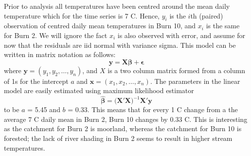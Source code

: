 Prior to analysis all temperatures have been centred around the mean daily temperature which for the time series is 7 \degrees C.  Hence, $y_i$ is the $i$th  (paired) observation of centred daily mean temperatures in Burn 10, and $x_i$ is the same for Burn 2. We will ignore the fact $x_i$ is also observed with error, and assume for now that the residuals are iid normal with variance sigma.  This model can be written in matrix notation as follows:
\begin{equation}
  \bm{y} = \bm{X\beta} + \bm{\epsilon}
\end{equation}
where $\bm{y} = (y_1, y_2, \ldots, y_n)$, and $X$ is a two column matrix formed from a column of 1s for the intercept $a$ and $\bm{x} = (x_1, x_2, \ldots, x_n)$. The parameters in the linear model are easily estimated using maximum likelihood estimator
\begin{equation}
  \hat{\bm{\beta}} = \Big(\bm{X}'\bm{X}\Big)^{-1} \bm{X}' \bm{y}
\end{equation}
to be $a$ = 5.45 and $b$ = 0.33. This means that for every 1 \degrees C change from a the average 7 \degrees C daily mean in Burn 2, Burn 10 changes by 0.33 \degrees C.  This is interesting as the catchment for Burn 2 is moorland, whereas the catchment for Burn 10 is forested; the lack of river shading in Burn 2 seems to result in higher stream temperatures.

